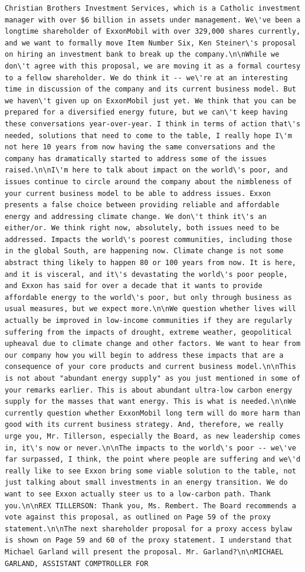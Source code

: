 \documentclass[
  letterpaper,
  DIV=11,
  numbers=noendperiod]{scrreprt}
\begin{document}
\begin{verbatim}
Christian Brothers Investment Services, which is a Catholic investment manager with over $6 billion in assets under management. We\'ve been a longtime shareholder of ExxonMobil with over 329,000 shares currently, and we want to formally move Item Number Six, Ken Steiner\'s proposal on hiring an investment bank to break up the company.\n\nWhile we don\'t agree with this proposal, we are moving it as a formal courtesy to a fellow shareholder. We do think it -- we\'re at an interesting time in discussion of the company and its current business model. But we haven\'t given up on ExxonMobil just yet. We think that you can be prepared for a diversified energy future, but we can\'t keep having these conversations year-over-year. I think in terms of action that\'s needed, solutions that need to come to the table, I really hope I\'m not here 10 years from now having the same conversations and the company has dramatically started to address some of the issues raised.\n\nI\'m here to talk about impact on the world\'s poor, and issues continue to circle around the company about the nimbleness of your current business model to be able to address issues. Exxon presents a false choice between providing reliable and affordable energy and addressing climate change. We don\'t think it\'s an either/or. We think right now, absolutely, both issues need to be addressed. Impacts the world\'s poorest communities, including those in the global South, are happening now. Climate change is not some abstract thing likely to happen 80 or 100 years from now. It is here, and it is visceral, and it\'s devastating the world\'s poor people, and Exxon has said for over a decade that it wants to provide affordable energy to the world\'s poor, but only through business as usual measures, but we expect more.\n\nWe question whether lives will actually be improved in low-income communities if they are regularly suffering from the impacts of drought, extreme weather, geopolitical upheaval due to climate change and other factors. We want to hear from our company how you will begin to address these impacts that are a consequence of your core products and current business model.\n\nThis is not about "abundant energy supply" as you just mentioned in some of your remarks earlier. This is about abundant ultra-low carbon energy supply for the masses that want energy. This is what is needed.\n\nWe currently question whether ExxonMobil long term will do more harm than good with its current business strategy. And, therefore, we really urge you, Mr. Tillerson, especially the Board, as new leadership comes in, it\'s now or never.\n\nThe impacts to the world\'s poor -- we\'ve far surpassed, I think, the point where people are suffering and we\'d really like to see Exxon bring some viable solution to the table, not just talking about small investments in an energy transition. We do want to see Exxon actually steer us to a low-carbon path. Thank you.\n\nREX TILLERSON: Thank you, Ms. Rembert. The Board recommends a vote against this proposal, as outlined on Page 59 of the proxy statement.\n\nThe next shareholder proposal for a proxy access bylaw is shown on Page 59 and 60 of the proxy statement. I understand that Michael Garland will present the proposal. Mr. Garland?\n\nMICHAEL GARLAND, ASSISTANT COMPTROLLER FOR 
\end{verbatim}
\end{document}
